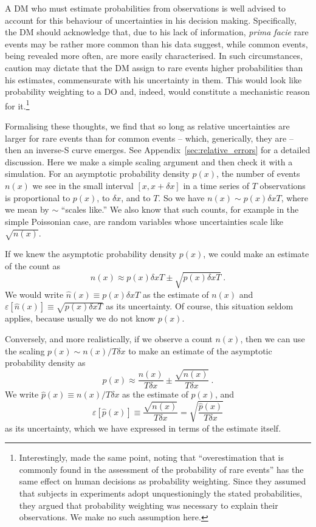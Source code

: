 \documentclass[%
	a4paper,
	abstract=true,	
	12pt,
	numbers=noenddot,
]{scrartcl}
\newcommand{\elabel}[1]{\label{eq:#1}}
\newcommand{\Appref}[1]{Appendix~\ref{sec:#1}}
\newcommand{\be}{\begin{equation}}
\newcommand{\ee}{\end{equation}}
\newcommand{\err}[1]{\varepsilon\left[#1\right]}
\newcommand{\phat}{\hat{p}}
\newcommand{\nhat}{\hat{n}}
\begin{document}
A DM who must estimate probabilities from observations is well advised to account for this behaviour of uncertainties in his decision making. Specifically, the DM should acknowledge that, due to his lack of information, \textit{prima facie} rare events may be rather more common than his data suggest, while common events, being revealed more often, are more easily characterised. In such circumstances, caution may dictate that the DM assign to rare events higher probabilities than his estimates, commensurate with his uncertainty in them. This would look like probability weighting to a DO and, indeed, would constitute a mechanistic reason for it.\footnote{Interestingly, \textcite[p.~281]{KahnemanTversky1979} made the same point, noting that ``overestimation that is commonly found in the assessment of the probability of rare events'' has the same effect on human decisions as probability weighting. Since they assumed that subjects in experiments adopt unquestioningly the stated probabilities, they argued that probability weighting was necessary to explain their observations. We make no such assumption here.}

Formalising these thoughts, we find that so long as relative uncertainties are larger for rare events than for common events -- which, generically, they are -- then an inverse-S curve emerges. See \Appref{relative_errors} for a detailed discussion. Here we make a simple scaling argument and then check it with a simulation. For an asymptotic probability density $p(x)$, the number of events $n(x)$ we see in the small interval $[x, x+ \delta x]$ in a time series of $T$ observations is proportional to $p(x)$, to $\delta x$, and to $T$. So we have $n(x) \sim p(x) \delta x T$, where we mean by $\sim$ ``scales like.'' We also know that such counts, for example in the simple Poissonian case, are random variables whose uncertainties scale like $\sqrt{n(x)}$.

If we knew the asymptotic probability density $p(x)$, we could make an estimate of the count as
\be
n(x) \approx p(x) \delta x T \pm \sqrt{p(x) \delta x T} ~.
\elabel{count_est}
\ee
We would write $\nhat(x) \equiv p(x) \delta x T$ as the estimate of $n(x)$ and $\err{\nhat(x)} \equiv \sqrt{p(x) \delta x T}$ as its uncertainty. Of course, this situation seldom applies, because usually we do not know $p(x)$.

Conversely, and more realistically, if we observe a count $n(x)$, then we can use the scaling $ p(x) \sim n(x)/T\delta x$ to make an estimate of the asymptotic probability density as
\be
p(x) \approx \frac{n(x)}{T\delta x} \pm \frac{\sqrt{n(x)}}{T \delta x} ~.
\elabel{prob_est}
\ee
We write $\phat(x) \equiv n(x)/T\delta x$ as the estimate of $p(x)$, and
\be
\err{\phat(x)} \equiv \frac{\sqrt{n(x)}}{T \delta x} = \sqrt{\frac{\phat(x)}{T \delta x}}
\ee
as its uncertainty, which we have expressed in terms of the estimate itself.
\end{document}
